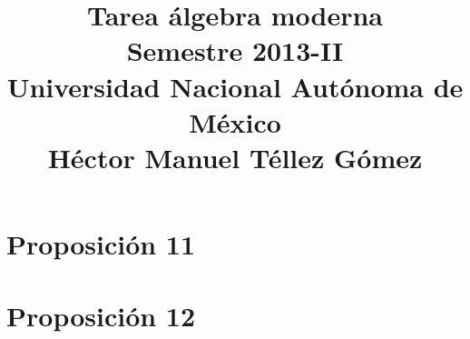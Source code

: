 \documentclass[a5paper,oneside]{amsart}
\title[Tarea álgebra moderna]{Tarea álgebra moderna\\ Semestre 2013-II\\ Universidad Nacional Autónoma de México\\ Héctor Manuel Téllez Gómez}
\theoremstyle{dotless}
\begin{document}
	\maketitle
	\section*{Proposición 11}
        
        
	\section*{Proposición 12}
\end{document}
